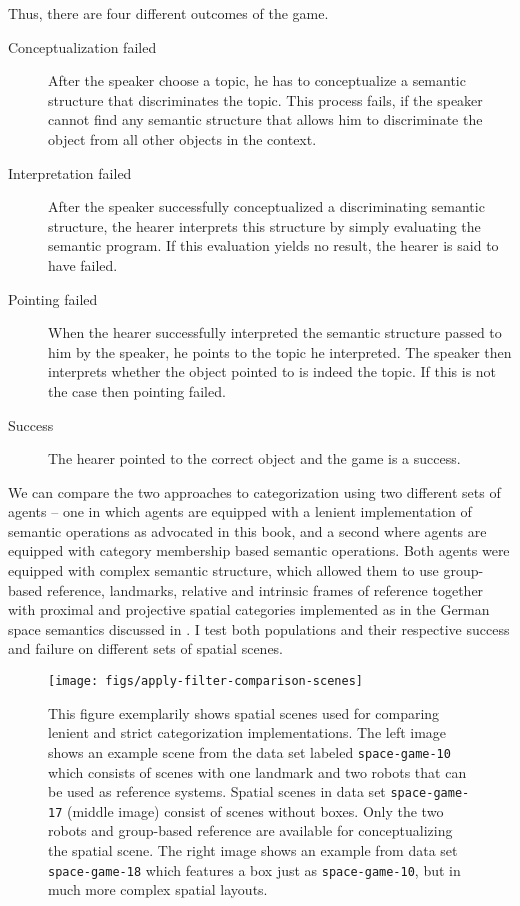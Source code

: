 Thus, there are four different outcomes of the game.
\begin{description}
\item[Conceptualization failed] After the speaker choose a topic, he has
to conceptualize a semantic structure that discriminates the topic.
This process fails, if the speaker cannot find any semantic structure
that allows him to discriminate the object from all other objects in the
context.
\item[Interpretation failed] After the speaker successfully conceptualized
a discriminating semantic structure, the hearer interprets this structure
by simply evaluating the semantic program. If this evaluation
yields no result, the hearer is said to have failed.
\item[Pointing failed] When the hearer successfully interpreted the
semantic structure passed to him by the speaker, he points
to the topic he interpreted. The speaker then interprets whether
the object pointed to is indeed the topic. If this is not the
case then pointing failed.
\item[Success] The hearer pointed to the correct object and
the game is a success. 
\end{description}

We can compare the two approaches to categorization 
using two different sets of agents --
one in which agents are equipped with a lenient implementation 
of semantic operations as advocated in this book, and a second where
agents are equipped with category membership based
semantic operations. Both agents were equipped with
complex semantic structure, which allowed them to use
group-based reference, landmarks, relative and intrinsic frames
of reference together with proximal and projective spatial categories
implemented as in the German space semantics discussed in 
. I test both populations and 
their respective success and failure on different sets of spatial scenes.

\begin{figure}
\begin{center}
\texttt{[image: figs/apply-filter-comparison-scenes]}
\end{center}
\caption[Spatial scenes used to compare lenient vs. strict categorization]
{%
This figure exemplarily shows spatial scenes used for comparing lenient and strict
categorization implementations. The left image shows an example scene from the data 
set labeled {\footnotesize\tt space-game-10} which consists of scenes with one landmark and two robots 
that can be used as reference systems. Spatial scenes in data set {\footnotesize\tt space-game-17} (middle image) consist of scenes without boxes.
Only the two robots and group-based reference are available for conceptualizing the spatial
scene. The right image shows an example from data set {\footnotesize\tt space-game-18} which features a box 
just as {\footnotesize\tt space-game-10}, but in much more complex spatial layouts.}
\label{f:lenient-vs-strict-scenes}
\end{figure}

